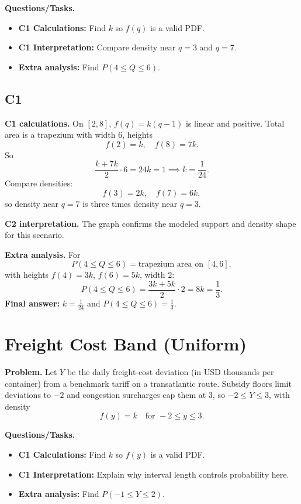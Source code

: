 	\textbf{Questions/Tasks.}
	\begin{itemize}
		\item \textbf{C1 Calculations:} Find $k$ so $f(q)$ is a valid PDF.
		\item \textbf{C1 Interpretation:} Compare density near $q=3$ and $q=7$.
		\item \textbf{Extra analysis:} Find $P(4\le Q\le 6)$.
	\end{itemize}

	\subsection*{C1}

\textbf{C1 calculations.}
On $[2,8]$, $f(q)=k(q-1)$ is linear and positive. Total area is a trapezium with width $6$, heights
	\[
	f(2)=k,\quad f(8)=7k.
	\]
	So
	\[
	\frac{k+7k}{2}\cdot6=24k=1\implies k=\frac1{24}.
	\]
	Compare densities:
	\[
	f(3)=2k,\quad f(7)=6k,
	\]
	so density near $q=7$ is three times density near $q=3$.

\textbf{C2 interpretation.}
The graph confirms the modeled support and density shape for this scenario.

\textbf{Extra analysis.}
For
\[
P(4\le Q\le6)=\text{trapezium area on }[4,6],
\]
with heights $f(4)=3k$, $f(6)=5k$, width $2$:
\[
P(4\le Q\le6)=\frac{3k+5k}{2}\cdot2=8k=\frac13.
\]
\textbf{Final answer:} $k=\frac1{24}$ and $P(4\le Q\le6)=\frac13$.
	\section{Freight Cost Band (Uniform)}
	
	\textbf{Problem.}
	Let $Y$ be the daily freight-cost deviation (in USD thousands per container) from a benchmark tariff on a transatlantic route. Subsidy floors limit deviations to $-2$ and congestion surcharges cap them at $3$, so $-2\le Y\le 3$, with density
	\[
	f(y)=k\quad\text{for }-2\le y\le 3.
	\]
	
	\textbf{Questions/Tasks.}
	\begin{itemize}
		\item \textbf{C1 Calculations:} Find $k$ so $f(y)$ is a valid PDF.
		\item \textbf{C1 Interpretation:} Explain why interval length controls probability here.
		\item \textbf{Extra analysis:} Find $P(-1\le Y\le 2)$.
	\end{itemize}

